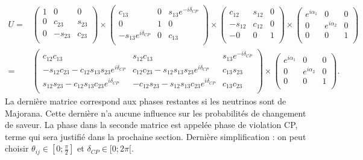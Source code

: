         \begin{eqnarray}
          U= & 
          \left(\begin{matrix}
            1   &    0    &    0   \\
            0   & c_{23}  & s_{23} \\
            0   & -s_{23} & c_{23} \\
          \end{matrix}\right)\times
          \left(\begin{matrix}
            c_{13}  &    0    & s_{13}e^{-i\delta_{CP}} \\
            0   &    1    &    0   \\
            -s_{13}e^{i\delta_{CP}} &    0    & c_{13} \\
          \end{matrix}\right)\times
          \left(\begin{matrix}
            c_{12}  & s_{12}  &    0   \\
            -s_{12} & c_{12}  &    0   \\
            -                    0   &    0    &    1   \\
          \end{matrix}\right)\times
          \left(\begin{matrix}
            e^{i\alpha_1} &    0    &    0   \\
            0   & e^{i\alpha_2} & 0 \\
            0   & 0 & 1 \\
          \end{matrix}\right) \\\label{eq::pmns}
          =& 
          \left(\begin{matrix}
            c_{12}c_{13}                                    & s_{12}c_{13}                                    & s_{13}e^{-i\delta_{CP}} \\
            -s_{12}c_{23}-c_{12}s_{13}s_{23}e^{i\delta_{CP}} & c_{12}c_{23}-s_{12}s_{13}s_{23}e^{i\delta_{CP}} & c_{13}s_{23} \\
            s_{12}s_{23}-c_{12}s_{13}c_{23}e^{i\delta_{CP}} & -c_{12}s_{23}-s_{12}s_{13}c_{23}e^{i\delta_{CP}} & c_{13}c_{23} \\
          \end{matrix}\right)\times
          \left(\begin{matrix}
            e^{i\alpha_1} &    0    &    0   \\
            0   & e^{i\alpha_2} & 0 \\
            0   & 0 & 1 \\
          \end{matrix}\right) .
        \end{eqnarray}
        La dernière matrice correspond aux phases restantes si les neutrinos sont de Majorana. Cette dernière n'a aucune influence sur les probabilités de changement de saveur. La phase dans la seconde matrice est appelée phase de violation CP, terme qui sera justifié dans la prochaine section. Dernière simplification : on peut choisir $\theta_{ij}\in [0;\frac{\pi}{2}]$ et $\delta_{CP}\in[0;2\pi[$.

